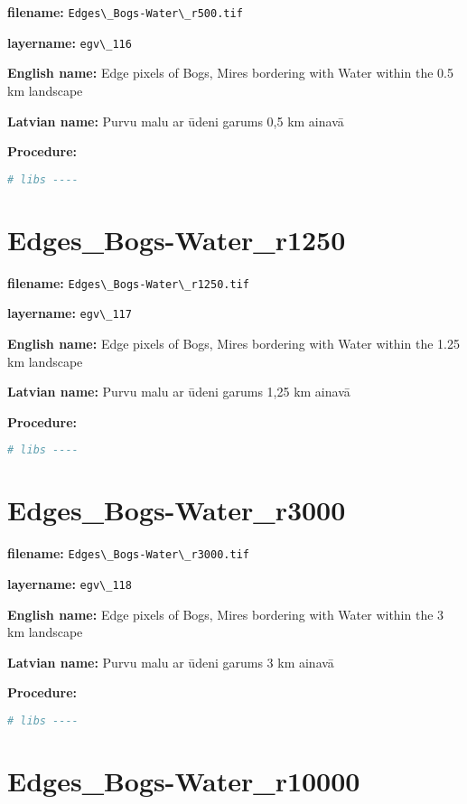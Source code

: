 \documentclass[
]{book}
\newcommand{\passthrough}[1]{#1}
\begin{document}
\textbf{filename:} \passthrough{\lstinline!Edges\_Bogs-Water\_r500.tif!}

\textbf{layername:} \passthrough{\lstinline!egv\_116!}

\textbf{English name:} Edge pixels of Bogs, Mires bordering with Water within the 0.5 km landscape

\textbf{Latvian name:} Purvu malu ar ūdeni garums 0,5 km ainavā

\textbf{Procedure:}

\begin{lstlisting}[language=R]
# libs ----
\end{lstlisting}

\section{Edges\_Bogs-Water\_r1250}\label{ch06.117}

\textbf{filename:} \passthrough{\lstinline!Edges\_Bogs-Water\_r1250.tif!}

\textbf{layername:} \passthrough{\lstinline!egv\_117!}

\textbf{English name:} Edge pixels of Bogs, Mires bordering with Water within the 1.25 km landscape

\textbf{Latvian name:} Purvu malu ar ūdeni garums 1,25 km ainavā

\textbf{Procedure:}

\begin{lstlisting}[language=R]
# libs ----
\end{lstlisting}

\section{Edges\_Bogs-Water\_r3000}\label{ch06.118}

\textbf{filename:} \passthrough{\lstinline!Edges\_Bogs-Water\_r3000.tif!}

\textbf{layername:} \passthrough{\lstinline!egv\_118!}

\textbf{English name:} Edge pixels of Bogs, Mires bordering with Water within the 3 km landscape

\textbf{Latvian name:} Purvu malu ar ūdeni garums 3 km ainavā

\textbf{Procedure:}

\begin{lstlisting}[language=R]
# libs ----
\end{lstlisting}

\section{Edges\_Bogs-Water\_r10000}\label{ch06.119}
\end{document}
